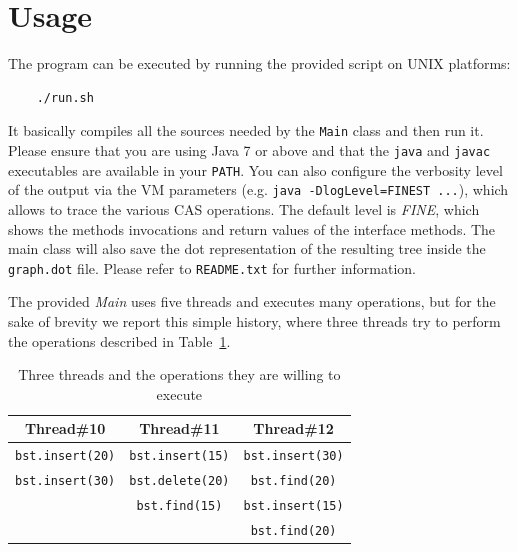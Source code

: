 \documentclass[a4paper,12pt]{article}
\begin{document}
\section{Usage} %
\label{sec:usage}
The program can be executed by running the provided script on UNIX platforms:
\begin{verbatim}
    ./run.sh
\end{verbatim}
It basically compiles all the sources needed by the \texttt{Main} class and then run it.
Please ensure that you are using Java 7 or above and that the \texttt{java} and \texttt{javac} executables are available in your \texttt{PATH}.
You can also configure the verbosity level of the output via the VM parameters (e.g. \texttt{java -DlogLevel=FINEST ...}), which allows to trace the various \ac{CAS} operations.
The default level is \emph{FINE}, which shows the methods invocations and return values of the interface methods.
The main class will also save the dot representation of the resulting tree inside the \texttt{graph.dot} file.
Please refer to \texttt{README.txt} for further information.

The provided \emph{Main} uses five threads and executes many operations, but for the sake of brevity we report this simple history, where three threads try to perform the operations described in Table~\ref{table:thread_ops}.

\begin{table}
\centering
\begin{tabular}{c|c|c}
{\bf Thread\#10} & {\bf Thread\#11} & {\bf Thread\#12} \\
\hline
\texttt{bst.insert(20)}   & \texttt{bst.insert(15)}   & \texttt{bst.insert(30)}   \\
\texttt{bst.insert(30)}   & \texttt{bst.delete(20)}   & \texttt{bst.find(20)}     \\
                 & \texttt{bst.find(15)}     & \texttt{bst.insert(15)}   \\
                 &                  & \texttt{bst.find(20)}
\end{tabular}
\caption{Three threads and the operations they are willing to execute}
\label{table:thread_ops}
\end{table}
\end{document}
